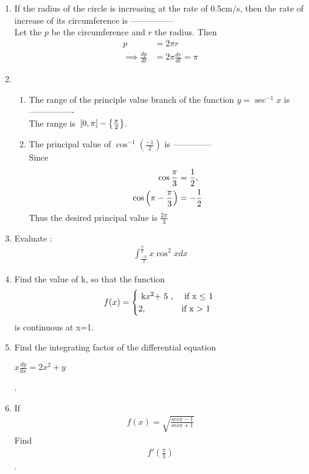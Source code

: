 \documentclass[journal,12pt,twocolumn]{IEEEtran}
\renewcommand\thesection{\arabic{section}}
\begin{document}
\begin{enumerate}[label=\thesection.\arabic*.,ref=\thesection.\theenumi]
\item  If the radius of the circle is increasing at the rate of 0.5cm/s, then the rate of increase of its circumference is ---------------\\
	\solution Let the $p$ be the circumference and $r$ the radius.  Then 
		\begin{align}
			p	&= 2\pi r
			\\
			\implies \frac{dp}{dt} &= 2\pi\frac{dr}{dt} = \pi
		\end{align}

\item \begin{enumerate} \item The range of the principle value branch of the function $ y= \sec^{-1}x $ is ----------------
			\\
			\solution The range is ${}\left[0,\pi\right] - \left\{\frac{\pi}{2}\right\}$.
    
\item The principal value of $\cos^{-1} \left(\frac{-1}{2}\right)$ is --------------\\
	\solution Since
		\begin{align}
			\cos \frac{\pi}{3} &= \frac{1}{2},
			\\
			\cos \left(\pi - \frac{\pi}{3}\right) &= -\frac{1}{2}
		\end{align}
		Thus the desired principal value is $\frac{2\pi}{3}$
\end{enumerate}

\item  Evaluate :
	\begin{align}
         \int_{\frac{-\pi}{2}}^{\frac{\pi}{2}} x \cos^2 x dx \nonumber
	\end{align}  


\item  Find the value of k, so that the function \begin{equation*}  f(x)  = \begin{cases}
                $ k$ x^2 $+ 5 $ ,  &\text{ if  x $\leq$ 1 } \\
        2 , &\text{if x $ > $ 1}
\end{cases} \end{equation*}  is continuous at x=1. \\
\item  Find the integrating factor of the differential equation \begin{center} $ x\frac{dy}{dx} = 2x^2 +y $ \end{center} .
\item If \begin{align} f\left(x\right)= \sqrt{\frac{sec x-1}{sec x+1}}\nonumber \end{align} Find \begin{align} f'\left(\frac{\pi}{3}\right) \nonumber \end{align}.


\end{enumerate}
\end{document}
